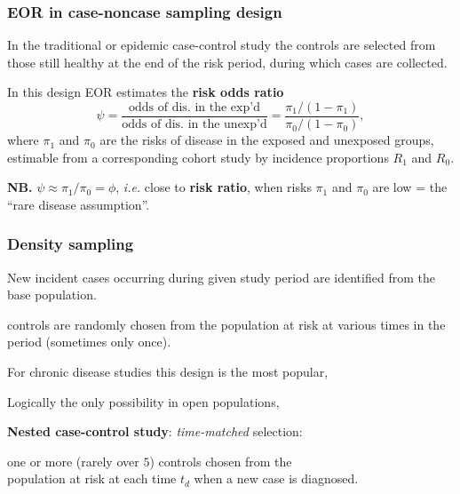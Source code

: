 \documentclass[handout,12pt]{beamer}
\begin{document}
\begin{frame}
\frametitle{EOR in case-noncase sampling design}

\bi
\item
In the traditional or epidemic case-control study
the controls are selected from
those still healthy at the end of the
risk period, during which cases are collected.
\medskip
\pause
\item
In this design EOR estimates the {\bf risk odds ratio} 
$$ \psi = \frac{ \text{odds of dis. in the exp'd} }
                     {   \text{odds of dis. in the unexp'd} } 
     = \frac{ \pi_1/(1-\pi_1) }{ \pi_0/(1-\pi_0) }, $$
  where $\pi_1$ and $\pi_0$ are the {risks} of disease in the exposed and unexposed groups, estimable from a corresponding cohort study by
  incidence proportions $R_1$ and $R_0$. 
\pause
\medskip 
\item 
{\bf NB.}  $\psi \approx \pi_1 / \pi_0 = \phi$, {\it i.e.} close to {\bf risk ratio}, when risks $\pi_1$ and $\pi_0$ are low %
\pause
= the ``rare disease assumption''.              
\ei

\end{frame} 


\begin{frame} \frametitle{Density sampling}

\bi
\item New incident cases occurring during given study period 
      are identified from the base population.
\medskip      
\item controls are randomly chosen from the population  
      at risk at various times in the period 
      (sometimes only once).
\medskip      
 \item For chronic disease studies this design is the most popular,
\item Logically the only possibility in open populations,
\ei

{\bf Nested case-control study}: {\it time-matched} selection:
\bi
\item one or more (rarely over $5$)
 controls chosen from the \\ population at risk 
 at each time $t_d$ when a new case is diagnosed. 
 \ei
\end{frame} 


\end{document}
